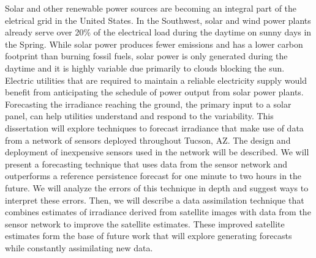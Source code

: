 Solar and other renewable power sources are becoming an integral part
of the eletrical grid in the United States.
In the Southwest, solar and wind power plants already serve over 20\%
of the electrical load during the daytime on sunny days in the Spring.
While solar power produces fewer emissions and has a lower carbon
footprint than burning fossil fuels, solar power is only generated
during the daytime and it is highly variable due primarily to clouds
blocking the sun.
Electric utilities that are required to maintain a reliable
electricity supply would benefit from anticipating the schedule of
power output from solar power plants.
Forecasting the irradiance reaching the ground, the primary input to a
solar panel, can help utilities understand and respond to the
variability.
This dissertation will explore techniques to forecast irradiance that
make use of data from a network of sensors deployed throughout Tucson,
AZ.
The design and deployment of inexpensive sensors used in the network
will be described.
We will present a forecasting technique that uses data from the
sensor network and outperforms a reference persistence forecast for
one minute to two hours in the future.
We will analyze the errors of this technique in depth and suggest ways
to interpret these errors.
Then, we will describe a data assimilation technique that combines
estimates of irradiance derived from satellite images with data from
the sensor network to improve the satellite estimates.
These improved satellite estimates form the base of future work that will
explore generating forecasts while constantly assimilating new data.

